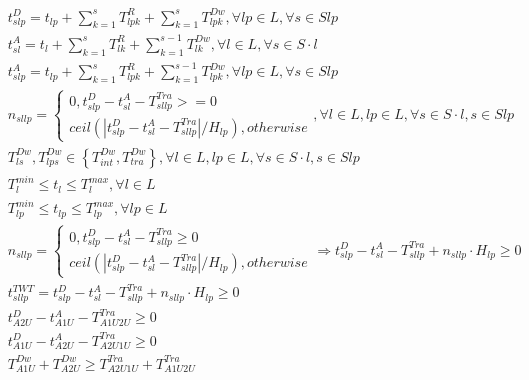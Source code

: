 \begin{align}
  & t_{s lp}^{D} = t_{lp} + \sum_{k = 1}^{s} T_{lp k}^{R} + \sum_{k = 1}^{s} T_{lp k}^{D w} , \forall lp \in L , \forall s \in S lp \tag{eq\_0014\_d} \\
  & t_{s l}^{A} = t_{l} + \sum_{k = 1}^{s} T_{l k}^{R} + \sum_{k = 1}^{s - 1} T_{l k}^{D w} , \forall l \in L , \forall s \in S \cdot l \tag{eq\_0014\_e} \\
  & t_{s lp}^{A} = t_{lp} + \sum_{k = 1}^{s} T_{lp k}^{R} + \sum_{k = 1}^{s - 1} T_{lp k}^{D w} , \forall lp \in L , \forall s \in S lp \tag{eq\_0014\_f} \\
  & n_{s l lp} = \begin{cases} 0 , t_{s lp}^{D} - t_{s l}^{A} - T_{s l lp}^{T r a} > = 0 \\ \mathit{ceil} \left(\left|\right. t_{s lp}^{D} - t_{s l}^{A} - T_{s l lp}^{T r a} \left|\right. / H_{lp}\right) , otherwise \end{cases} , \forall l \in L , lp \in L , \forall s \in S \cdot l , s \in S lp \tag{eq\_0014\_g} \\
  & T_{l s}^{D w} , T_{lp s}^{D w} \in \left\{T_{int}^{D w} , T_{tra}^{D w}\right\} , \forall l \in L , lp \in L , \forall s \in S \cdot l , s \in S lp \tag{eq\_0014\_h} \\
  & T_{l}^{min} \leq t_{l} \leq T_{l}^{max} , \forall l \in L \tag{eq\_0014\_i} \\
  & T_{lp}^{min} \leq t_{lp} \leq T_{lp}^{max} , \forall lp \in L \tag{eq\_0014\_j} \\
  & n_{s l lp} = \begin{cases} 0 , t_{s lp}^{D} - t_{s l}^{A} - T_{s l lp}^{T r a} \geq 0 \\ \mathit{ceil} \left(\left|\right. t_{s lp}^{D} - t_{s l}^{A} - T_{s l lp}^{T r a} \left|\right. / H_{lp}\right) , otherwise \end{cases} \Rightarrow t_{s lp}^{D} - t_{s l}^{A} - T_{s l lp}^{T r a} + n_{s l lp} \cdot H_{lp} \geq 0 \tag{eq\_0015} \\
  & t_{s l lp}^{T W T} = t_{s lp}^{D} - t_{s l}^{A} - T_{s l lp}^{T r a} + n_{s l lp} \cdot H_{lp} \geq 0 \tag{eq\_0016} \\
  & t_{A 2 U}^{D} - t_{A 1 U}^{A} - T_{A 1 U 2 U}^{T r a} \geq 0 \tag{eq\_0021\_a} \\
  & t_{A 1 U}^{D} - t_{A 2 U}^{A} - T_{A 2 U 1 U}^{T r a} \geq 0 \tag{eq\_0021\_b} \\
  & T_{A 1 U}^{D w} + T_{A 2 U}^{D w} \geq T_{A 2 U 1 U}^{T r a} + T_{A 1 U 2 U}^{T r a} \tag{eq\_0022} \\
\end{align}
